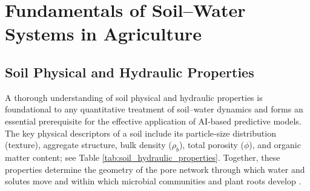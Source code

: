 \documentclass[land,review,accept,pdftex,oneauthor]{Definitions/mdpi}
\begin{document}
\section{{Fundamentals of Soil--Water Systems in Agriculture}}\label{sec2}

\subsection{Soil Physical and Hydraulic Properties}

A thorough understanding of soil physical and hydraulic properties is foundational to any quantitative treatment of soil--water dynamics and forms an essential prerequisite for the effective application of AI-based predictive models. The key physical descriptors of a soil include its particle-size distribution (texture), aggregate structure, bulk density ($\rho_b$), total porosity ($\phi$), and organic matter content; see Table \ref{tab:soil_hydraulic_properties}. Together, these properties determine the geometry of the pore network through which water and solutes move and within which microbial communities and plant roots develop \citep{hillel2004,Lemenkova202318,HILLEL2003407,Lemenkova202224}.
\end{document}
